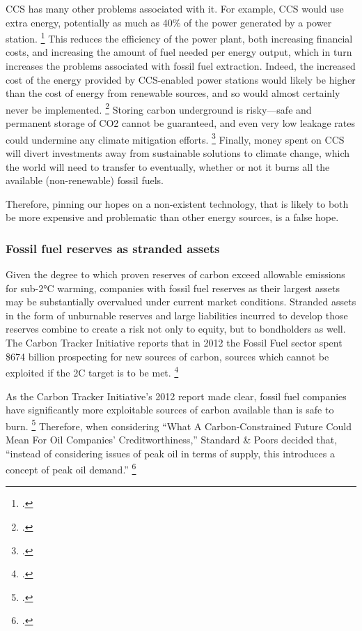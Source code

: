 CCS has many other problems associated with it. For example, CCS would use extra energy, potentially as much as 40\% of the power generated by a power station. \footcite{GPCCS}
This reduces the efficiency of the power plant, both increasing financial costs, and increasing the amount of fuel needed per energy output, which in turn increases the problems associated with fossil fuel extraction.
Indeed, the increased cost of the energy provided by CCS-enabled power stations would likely be higher than the cost of energy from renewable sources, and so would almost certainly never be implemented. \footcite{SmartPlanetCCS}
Storing carbon underground is risky—safe and permanent storage of CO2 cannot be guaranteed, and even very low leakage rates could undermine any climate mitigation efforts. \footcite{GPCCS}
Finally, money spent on CCS will divert investments away from sustainable solutions to climate change, which the world will need to transfer to eventually, whether or not it burns all the available (non-renewable) fossil fuels.

Therefore, pinning our hopes on a non-existent technology, that is likely to both be more expensive and problematic than other energy sources, is a false hope.




\subsubsection {Fossil fuel reserves as stranded assets} 



Given the degree to which proven reserves of carbon exceed allowable emissions for sub-2°C warming, companies with fossil fuel reserves as their largest assets may be substantially overvalued under current market conditions. 
Stranded assets in the form of unburnable reserves and large liabilities incurred to develop those reserves combine to create a risk not only to equity, but to bondholders as well.
The Carbon Tracker Initiative reports that in 2012 the Fossil Fuel sector spent \$674 billion prospecting for new sources of carbon, sources which cannot be exploited if the 2C target is to be met. \footcite{CTI2013}

As the Carbon Tracker Initiative's 2012 report made clear, fossil fuel companies have significantly more exploitable sources of carbon available than is safe to burn. \footcite{CTI2012}
Therefore, when considering ``What A Carbon-Constrained Future Could Mean For Oil Companies' Creditworthiness,'' Standard \& Poors decided that, ``instead of considering issues of peak oil in terms of supply, this introduces a concept of peak oil demand.'' \footcite{SandPConstrained}


